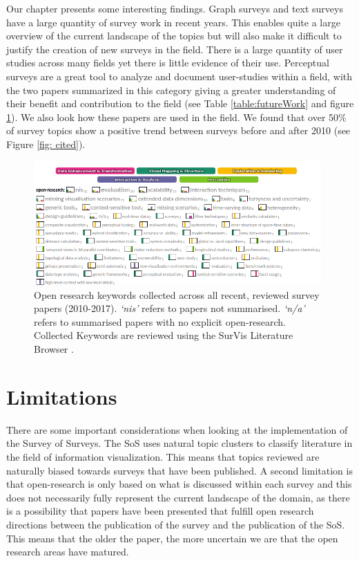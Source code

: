 Our chapter presents some interesting findings. Graph surveys and text surveys have a large quantity of survey work in recent years. This enables quite a large overview of the current landscape of the topics but will also make it difficult to justify the creation of new surveys in the field. There is a large quantity of user studies across many fields yet there is little evidence of their use. Perceptual surveys are a great tool to analyze and document user-studies within a field, with the two papers summarized in this category giving a greater understanding of their benefit and contribution to the field \cite{johansson2016evaluation, fuchs2016systematic} (see Table \ref{table:futureWork} and figure \ref{fig: openresearch}). We also look how these papers are used in the field. We found that over 50\% of survey topics show a positive trend between surveys before and after 2010 (see Figure \ref{fig: cited}).


\begin{figure}[t]
\begin{center}
\includegraphics[width=0.98\textwidth]{images/open-research2.png}
\caption{Open research keywords collected across all recent, reviewed survey papers (2010-2017). \textit{`nis'} refers to papers not summarised. \textit{`n/a'} refers to summarised papers with no explicit open-research. Collected Keywords are reviewed using the SurVis Literature Browser \cite{beck2016visual, surVis}.} \label{fig: openresearch}
\end{center}
\end{figure}

\section{Limitations}
There are some important considerations when looking at the implementation of the Survey of Surveys. The SoS uses natural topic clusters to classify literature in the field of information visualization. This means that topics reviewed are naturally biased towards surveys that have been published. A second limitation is that open-research is only based on what is discussed within each survey and this does not necessarily fully represent the current landscape of the domain, as there is a possibility that papers have been presented that fulfill open research directions between the publication of the survey and the publication of the SoS. This means that the older the paper, the more uncertain we are that the open research areas have matured.

